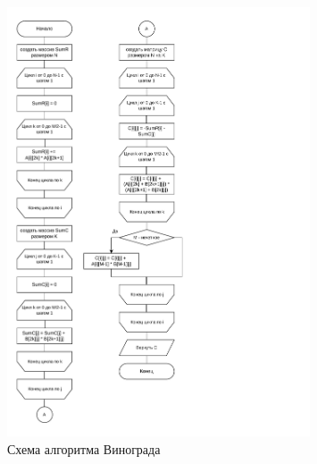 \begin{figure}[h!]
	\centering
	\includegraphics[height=0.8\textheight, width=0.8\textwidth]{tex_parts/scheme3.pdf}
	\caption{\label{fig:vi}Схема алгоритма Винограда}
\end{figure}

\clearpage

